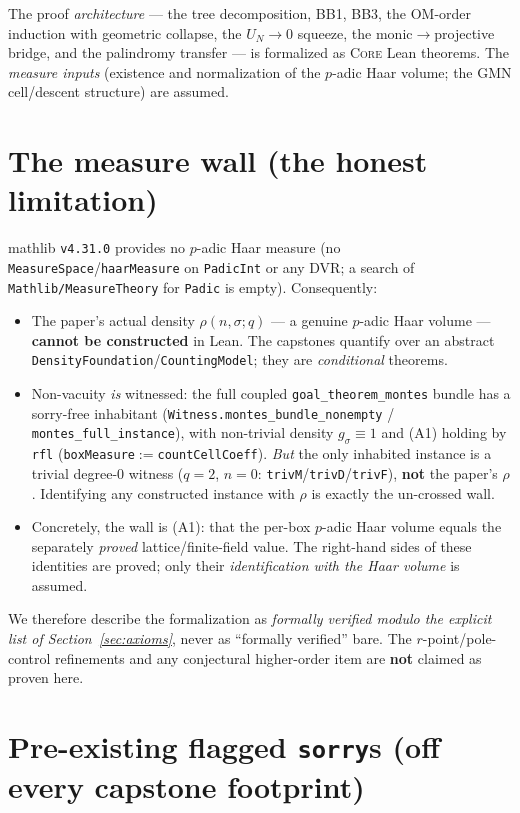 \documentclass[11pt]{article}
\newcommand{\code}[1]{\texttt{#1}}
\newcommand{\modulo}{\textsl{modulo}}
\newcommand{\Core}{\textsc{Core}}
\begin{document}
\noindent The proof \emph{architecture} --- the tree decomposition, BB1, BB3, the
OM-order induction with geometric collapse, the $U_N\to0$ squeeze, the monic$\to$projective
bridge, and the palindromy transfer --- is formalized as \Core{} Lean theorems. The
\emph{measure inputs} (existence and normalization of the $p$-adic Haar volume; the GMN
cell/descent structure) are assumed.

\section{The measure wall (the honest limitation)}\label{sec:wall}

\textsf{mathlib} \code{v4.31.0} provides no $p$-adic Haar measure (no
\code{MeasureSpace}/\code{haarMeasure} on \code{PadicInt} or any DVR; a search of
\code{Mathlib/MeasureTheory} for \code{Padic} is empty). Consequently:
\begin{itemize}[leftmargin=1.4em]
\item The paper's actual density $\rho(n,\sigma;q)$ --- a genuine $p$-adic Haar volume ---
\textbf{cannot be constructed} in Lean. The capstones quantify over an abstract
\code{DensityFoundation}/\code{CountingModel}; they are \emph{conditional} theorems.
\item Non-vacuity \emph{is} witnessed: the full coupled \code{goal\_theorem\_montes}
bundle has a sorry-free inhabitant (\code{Witness.montes\_bundle\_nonempty} /
\code{montes\_full\_instance}), with non-trivial density $g_\sigma\equiv 1$ and (A1)
holding by \code{rfl} (\code{boxMeasure}$:=$\code{countCellCoeff}). \emph{But} the only
inhabited instance is a trivial degree-$0$ witness ($q{=}2$, $n{=}0$:
\code{trivM}/\code{trivD}/\code{trivF}), \textbf{not} the paper's $\rho$. Identifying any
constructed instance with $\rho$ is exactly the un-crossed wall.
\item Concretely, the wall is (A1): that the per-box $p$-adic Haar volume equals the
separately \emph{proved} lattice/finite-field value. The right-hand sides of these
identities are proved; only their \emph{identification with the Haar volume} is assumed.
\end{itemize}
We therefore describe the formalization as \emph{formally verified \modulo{} the explicit
list of Section~\ref{sec:axioms}}, never as ``formally verified'' bare. The
$r$-point/pole-control refinements and any conjectural higher-order item are
\textbf{not} claimed as proven here.

\section{Pre-existing flagged \code{sorry}s (off every capstone footprint)}\label{sec:sorry}
\end{document}
